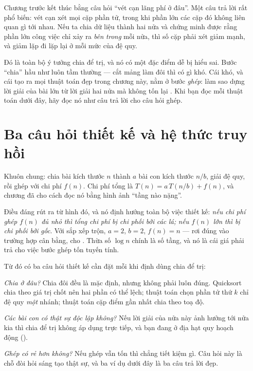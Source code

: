 \documentclass[../../algorithm.tex]{subfiles}
\begin{document}
Chương trước kết thúc bằng câu hỏi ``vét cạn lãng phí ở đâu''. Một câu trả lời rất phổ biến: vét cạn xét mọi cặp phần tử, trong khi phần lớn các cặp đó không liên quan gì tới nhau. Nếu ta chia dữ liệu thành hai nửa và chứng minh được rằng phần lớn công việc chỉ xảy ra \emph{bên trong} mỗi nửa, thì số cặp phải xét giảm mạnh, và giảm lặp đi lặp lại ở mỗi mức của đệ quy.

Đó là toàn bộ ý tưởng chia để trị, và nó có một đặc điểm dễ bị hiểu sai. Bước ``chia'' hầu như luôn tầm thường --- cắt mảng làm đôi thì có gì khó. Cái khó, và cái tạo ra mọi thuật toán đẹp trong chương này, nằm ở bước \emph{ghép}: làm sao dựng lời giải của bài lớn từ lời giải hai nửa mà không tốn lại . Khi bạn đọc mỗi thuật toán dưới đây, hãy đọc nó như câu trả lời cho câu hỏi ghép.

\section{Ba câu hỏi thiết kế và hệ thức truy hồi}

Khuôn chung: chia bài kích thước \(n\) thành \(a\) bài con kích thước \(n/b\), giải đệ quy, rồi ghép với chi phí \(f(n)\). Chi phí tổng là \(T(n) = a\,T(n/b) + f(n)\), và chương  đã cho cách đọc nó bằng hình ảnh ``tầng nào nặng''.

Điều đáng rút ra từ hình đó, và nó định hướng toàn bộ việc thiết kế: \emph{nếu chi phí ghép \(f(n)\) đủ nhỏ thì tổng chi phí bị chi phối bởi các lá; nếu \(f(n)\) lớn thì bị chi phối bởi gốc}. Với sắp xếp trộn, \(a=2\), \(b=2\), \(f(n)=n\) --- rơi đúng vào trường hợp cân bằng, cho . Thừa số \(\log n\) chính là số tầng, và nó là cái giá phải trả cho việc bước ghép tốn tuyến tính.

Từ đó có ba câu hỏi thiết kế cần đặt mỗi khi định dùng chia để trị:

\emph{Chia ở đâu?} Chia đôi đều là mặc định, nhưng không phải luôn đúng. Quicksort chia theo giá trị chốt nên hai phần có thể lệch; thuật toán chọn phần tử thứ \(k\) chỉ đệ quy \emph{một} nhánh; thuật toán cặp điểm gần nhất chia theo toạ độ.

\emph{Các bài con có thật sự độc lập không?} Nếu lời giải của nửa này ảnh hưởng tới nửa kia thì chia để trị không áp dụng trực tiếp, và bạn đang ở địa hạt quy hoạch động ().

\emph{Ghép có rẻ hơn không?} Nếu ghép vẫn tốn  thì chẳng tiết kiệm gì. Câu hỏi này là chỗ đòi hỏi sáng tạo thật sự, và ba ví dụ dưới đây là ba câu trả lời đẹp.
\end{document}
